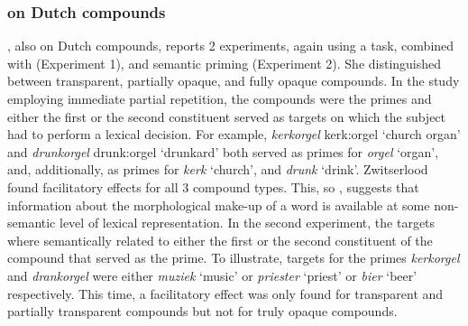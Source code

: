 \subsubsection{\citet{Zwitserlood:1994} on Dutch compounds}%
\label{sec:zwitserlood_1994}
\citet{Zwitserlood:1994}, also on Dutch compounds, reports
2 experiments, again using a  task, combined with
 (Experiment 1), and semantic priming
(Experiment 2). 
She distinguished between transparent, partially opaque, and
fully opaque compounds.
In the study employing immediate partial
repetition, the compounds were the primes and either the first or the
second constituent served as targets on which the subject had to
perform a lexical decision. For example, \emph{kerkorgel} kerk:orgel
`church organ'
and \emph{drunkorgel} drunk:orgel `drunkard' both served as primes for
\emph{orgel} `organ', and, additionally, as primes for 
\emph{kerk} `church', and  \emph{drunk} `drink'. Zwitserlood found
facilitatory effects for all 3 compound types.
This, so \citet[364]{Zwitserlood:1994}, suggests that information about the
morphological make-up of a word is available at some non-semantic
level of lexical representation.
In the second
experiment, the targets where semantically related to either the first
or the second constituent of the compound that served as the
prime. To illustrate, targets for the primes \emph{kerk\-orgel} and
\emph{drankorgel} were either \emph{muziek} `music' or
\emph{priester} `priest' or \emph{bier} `beer' respectively.  
This time, a facilitatory effect was only found for transparent and
partially transparent compounds but not for truly opaque compounds. 

